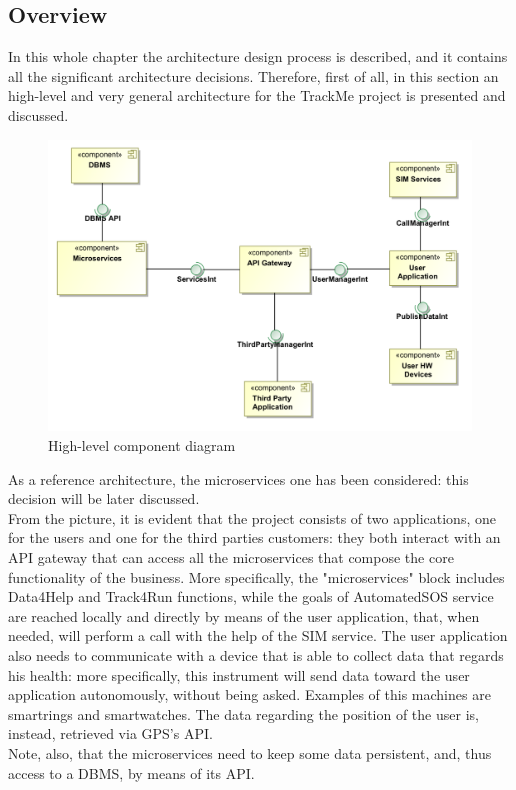 \subsection{Overview}
In this whole chapter the architecture design process is described, and it contains all the significant
architecture decisions. 
Therefore, first of all, in this section an high-level and very general architecture for the TrackMe 
project is presented and discussed.  

\begin{figure}[H]
\includegraphics[width=\linewidth]{Images/highlevelcd.pdf}
\caption{ High-level component diagram }
\label{fig:world2}
\end{figure}

As a reference architecture, the microservices one has been considered: this decision will be later discussed. \\
From the picture, it is evident that the project consists of two applications, one for the users and one for the third parties customers: they both interact with an API gateway that can access all the
microservices that compose the core functionality of the business.
More specifically, the "microservices" block includes Data4Help and Track4Run functions, while the goals
of AutomatedSOS service are reached locally and directly by means of the user application, that, when
needed, will perform a call with the help of the SIM service. The user application also needs to
communicate with a device that is able to collect data that regards his health: more specifically, this
instrument will send data toward the user application autonomously, without being asked. Examples of 
this machines are smartrings and smartwatches. The data regarding the position of the user is, instead, retrieved via GPS's API. \\
Note, also, that the microservices need to keep some data persistent, and, thus access to a DBMS, by means
of its API. \\

